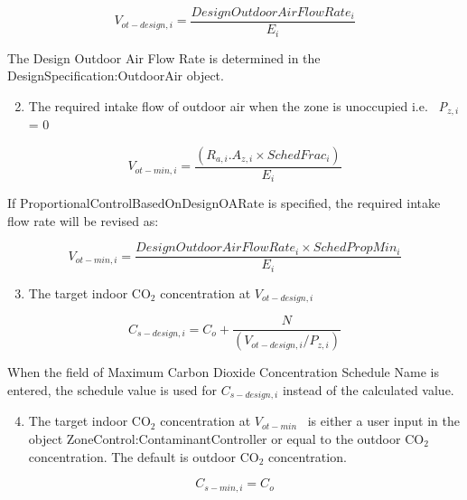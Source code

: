 \begin{equation}
{V_{ot - design,i}} = \frac{Design Outdoor Air Flow Rate_i} {E_i}
\end{equation}

The Design Outdoor Air Flow Rate is determined in the DesignSpecification:OutdoorAir object.

\begin{enumerate}
\setcounter{enumi}{1}
\item The required intake flow of outdoor air when the zone is unoccupied i.e.~ \emph{P\(_{z,i}\)} = 0
\end{enumerate}

\begin{equation}
{V_{ot - min,i}} = \frac{{({R_{a,i}}.{A_{z,i}} \times {SchedFrac_i})}}{{{E_i}}}
\end{equation}

If ProportionalControlBasedOnDesignOARate is specified, the required intake flow rate will be revised as:

\begin{equation}
{V_{ot - min,i}} = \frac{ {Design Outdoor Air Flow Rate_i} \times {SchedPropMin_i} } {E_i}
\end{equation}

\begin{enumerate}
\setcounter{enumi}{2}
\item The target indoor CO\(_{2}\) concentration at \({V_{ot - design,i}}\)
\end{enumerate}

\begin{equation}
{C_{s - design,i}} = {C_o} + \frac{N}{{\left( {{V_{ot - design,i}}/{P_{z,i}}} \right)}}
\end{equation}

When the field of Maximum Carbon Dioxide Concentration Schedule Name is entered, the schedule value is used for {$C_{s - design,i}$} instead of the calculated value.

\begin{enumerate}
\setcounter{enumi}{3}
\item The target indoor CO\(_{2}\) concentration at \({V_{ot - min}}\) ~is either a user input in the object ZoneControl:ContaminantController or equal to the outdoor CO\(_{2}\) concentration. The default is outdoor CO\(_{2}\) concentration.
\end{enumerate}

\begin{equation}
{C_{s - min,i}} = {C_o}
\end{equation}

